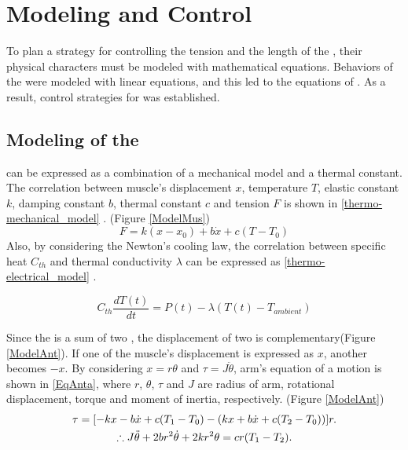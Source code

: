 \section{Modeling and Control}\label{section_modelcontrol}

To plan a strategy for controlling the tension and the length of the \scpsnospace, their physical characters must be modeled with mathematical equations. Behaviors of the \scps were modeled with linear equations, and this led to the equations of \antanospace.
As a result, control strategies for \apc was established.

\subsection{Modeling of the \ANTA}\label{section_thermo_model}
\scp can be expressed as a combination of a mechanical model and a thermal constant. The correlation between muscle's displacement $x$, temperature $T$, elastic constant $k$, damping constant $b$, thermal constant $c$ and tension $F$ is shown in \eqref{thermo-mechanical_model} \cite{yip}.
(Figure \ref{ModelMus})
\begin{equation} \label{thermo-mechanical_model}
F=k(x-x_0) + b\dot{x}+c(T-T_0)
\end{equation}
Also, by considering the Newton's cooling law, the correlation between specific heat $C_{th}$ and thermal conductivity $\lambda$ can be expressed as \eqref{thermo-electrical_model} \cite{yip}.

\begin{equation} \label{thermo-electrical_model}
C_{th}\frac{dT(t)}{dt} = P(t) - \lambda(T(t)-T_{ambient})
\end{equation}

Since the \anta is a sum of two \scpsnospace, the displacement of two \scps is complementary(Figure \ref{ModelAnt}). If one of the muscle's displacement is expressed as $x$, another becomes $-x$. By considering $x=r\theta$ and $\tau=J\ddot{\theta}$, arm's equation of a motion is shown in \eqref{EqAnta}, where $r$, $\theta$, $\tau$ and $J$ are radius of arm, rotational displacement, torque and moment of inertia, respectively.
(Figure \ref{ModelAnt})
\begin{gather}
\tau = [-kx-b\dot{x}+c(T_1-T_0) - (kx+b\dot{x}+c(T_2-T_0))]r. \notag \\
\therefore J\ddot{\theta}+2br^2\dot{\theta}+2kr^2\theta = cr(T_1-T_2). \label{EqAnta}
\end{gather}

